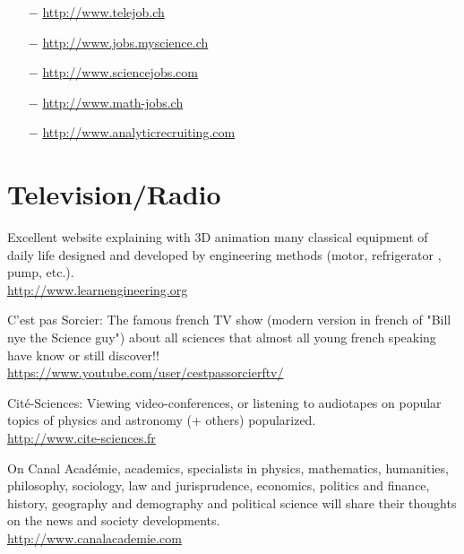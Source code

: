 	\begin{itemize}	 
		\item[$-$] \href{http://www.telejob.ch}{\color{blue}http://www.telejob.ch} 
	
		\item[$-$] \href{http://www.jobs.myscience.ch}{\color{blue}http://www.jobs.myscience.ch} 
	
		\item[$-$] \href{http://www.sciencejobs.com}{\color{blue}http://www.sciencejobs.com}
	
		\item[$-$] \href{http://www.math-jobs.ch}{\color{blue}http://www.math-jobs.ch}
	
		\item[$-$] \href{http://www.analyticrecruiting.com}{\color{blue}http://www.analyticrecruiting.com}
	\end{itemize}
	
	\section{Television/Radio}

	{\Large {}} Excellent website explaining with 3D animation many classical equipment of daily life designed and developed by engineering methods (motor, refrigerator , pump, etc.).\\
	\href{http://www.learnengineering.org}{\color{blue}http://www.learnengineering.org}
	
	\bcdfrance{} C'est pas Sorcier: The famous french TV show (modern version in french of "Bill nye the Science guy") about all sciences that almost all young french speaking have know or still discover!!\\
	\href{https://www.youtube.com/user/cestpassorcierftv/}{\color{blue}https://www.youtube.com/user/cestpassorcierftv/}
	
	\bcdfrance{} Cité-Sciences: Viewing video-conferences, or listening to audiotapes on popular topics of physics and astronomy (+ others) popularized.\\
	\href{http://www.cite-sciences.fr}{\color{blue}http://www.cite-sciences.fr}
	
	\bcdfrance{} On Canal Académie, academics, specialists in physics, mathematics, humanities, philosophy, sociology, law and jurisprudence, economics, politics and finance, history, geography and demography and political science will share their thoughts on the news and society developments.\\
	\href{http://www.canalacademie.com}{\color{blue}http://www.canalacademie.com}
	
